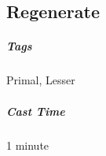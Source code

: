
\subsection{Regenerate}\label{spell:regenerate}
\subparagraph*{Tags} Primal, Lesser
\subparagraph*{Cast Time} 1 minute

